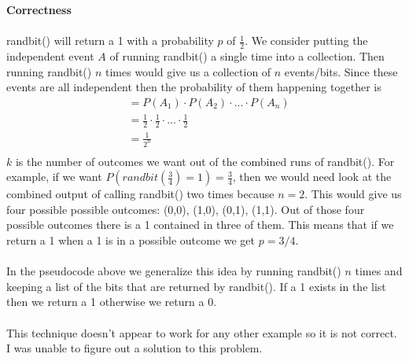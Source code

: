 \documentclass[12pt]{article}
\begin{document}
\begin{enumerate}
\begin{enumerate}
\begin{verbatim}
			\end{verbatim}
			\textbf{Correctness}\\
			\\
			randbit() will return a 1 with a probability $p$ of $\frac{1}{2}$.  
			We consider putting the independent event $A$ of running randbit() a single time into a collection.  
			Then running randbit() $n$ times would give us a collection of $n$ events/bits.
			Since these events are all independent then the probability of them happening together is 
			\begin{align*}
			&= P(A_1) \cdot P(A_2) \cdot ... \cdot P(A_n)\\
			&= \frac{1}{2} \cdot \frac{1}{2} \cdot ... \cdot \frac{1}{2}\\
			&= \frac{1}{2^n}\\
			\end{align*}
			$k$ is the number of outcomes we want out of the combined runs of randbit().  
			For example, if we want $P(randbit(\frac{3}{4})=1)=\frac{3}{4}$, then we would need look at the combined output of calling randbit() two times because $n=2$.
			This would give us four possible possible outcomes: (0,0), (1,0), (0,1), (1,1).  
			Out of those four possible outcomes there is a 1 contained in three of them.
			This means that if we return a 1 when a 1 is in a possible outcome we get $p = 3/4$.\\
			\\
			In the pseudocode above we generalize this idea by running randbit() $n$ times and 
			keeping a list of the bits that are returned by randbit().  If a 1 exists in the list then we return a 1
			otherwise we return a 0.\\
			\\
			This technique doesn't appear to work for any other example so it is not correct.
			I was unable to figure out a solution to this problem.
			\\	


\end{enumerate}
\end{enumerate}
\end{document}
